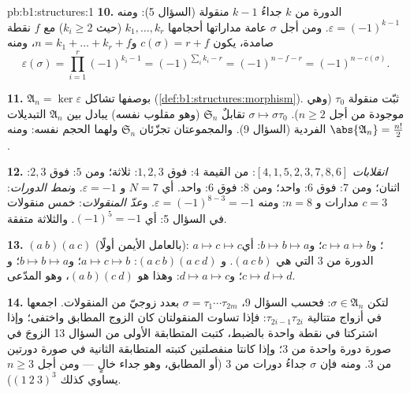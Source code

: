 \begin{solution}{pb:b1:structures:1}
\textbf{10.} الدورة من  $k$ جداءُ $k - 1$ منقولة
(السؤال 5): ومنه $\varepsilon = (-1)^{k-1}$. ومن أجل $\sigma$ عامة
مداراتها أحجامها $k_1, \dots, k_r$ (حيث $k_i \geq 2$) مع $f$
نقطة صامدة، يكون $c(\sigma) = r + f$ و$n = k_1 + \dots + k_r + f$،
ومنه
\[
\varepsilon(\sigma) = \prod_{i=1}^r (-1)^{k_i - 1}
= (-1)^{\sum_i k_i - r} = (-1)^{n - f - r} = (-1)^{n -
c(\sigma)} .
\]

\textbf{11.}  $\mathfrak A_n = \ker\varepsilon$  بوصفها
 تشاكل (\cref{def:b1:structures:morphism}). ثبّت
منقولة $\tau_0$ (وهي موجودة من أجل $n \geq 2$).  $\sigma
\mapsto \sigma\tau_0$ تقابلٌ  $\mathfrak S_n$ (وهو مقلوب
نفسه) يبادل بين $\mathfrak A_n$  التبديلات
الفردية (السؤال 9). والمجموعتان تجزّئان $\mathfrak S_n$
ولهما الحجم نفسه: ومنه $\abs{\mathfrak A_n} = \frac{n!}2$.

\textbf{12.} \emph{انقلابات} $[4, 1, 5, 2, 3, 7, 8, 6]$: من
القيمة $4$: فوق $1, 2, 3$: ثلاثة؛ ومن $5$: فوق $2, 3$: اثنان؛
ومن $7$: فوق $6$: واحد؛ ومن $8$: فوق $6$: واحد. أي $N = 7$
و $\varepsilon = -1$. و\emph{نمط الدورات}: $c = 3$ مدارات و $n = 8$:
ومنه $\varepsilon = (-1)^{8-3} = -1$. و\emph{عدّ المنقولات}: خمس
منقولات في السؤال 5: أي $(-1)^5 = -1$. والثلاثة متفقة.

\textbf{13.} $(a\ b)(a\ c)$ (بالعامل الأيمن أولًا): $a \mapsto c
\mapsto c$؛ و$c \mapsto a \mapsto b$؛ و$b \mapsto b \mapsto a$:
أي الدورة من  $3$ التي هي $(a\ c\ b)$. و $(a\ c\ b)(a\ c\ d)$: $a \mapsto c
\mapsto b$؛ و$b \mapsto b \mapsto a$؛ و$c \mapsto d \mapsto d$؛ و$d
\mapsto a \mapsto c$: وهذا هو $(a\ b)(c\ d)$، وهو المدّعى.

\textbf{14.} لتكن $\sigma \in \mathfrak A_n$: فحسب السؤال 9،
$\sigma = \tau_1\cdots\tau_{2m}$ بعدد زوجيّ من
المنقولات. اجمعها في أزواج متتالية
$\tau_{2i-1}\tau_{2i}$: فإذا تساوت المنقولتان كان الزوج
 المطابق واختفى؛ وإذا اشتركتا في نقطة واحدة بالضبط،
كتبت المتطابقة الأولى من السؤال 13 الزوجَ في صورة دورة واحدة من  $3$؛
وإذا كانتا منفصلتين كتبته المتطابقة الثانية في صورة دورتين
من  $3$. ومنه فإن $\sigma$ جداءُ دورات من  $3$ (أو
 المطابق، وهو جداء خالٍ --- ومن أجل $n \geq 3$ يساوي كذلك $(1\ 2\
3)^3$).


\end{solution}
